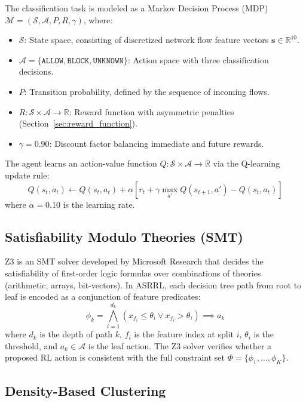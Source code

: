 \documentclass[12pt, letterpaper, oneside]{report}
\newcommand{\ASRRL}{\textsc{ASRRL}}
\newcommand{\R}{\mathbb{R}}
\newcommand{\bs}{\mathbf{s}}
\begin{document}
The classification task is modeled as a Markov Decision Process (MDP) $\mathcal{M} = (\mathcal{S}, \mathcal{A}, P, R, \gamma)$, where:
\begin{itemize}
    \item $\mathcal{S}$: State space, consisting of discretized network flow feature vectors $\bs \in \R^{10}$.
    \item $\mathcal{A} = \{\texttt{ALLOW}, \texttt{BLOCK}, \texttt{UNKNOWN}\}$: Action space with three classification decisions.
    \item $P$: Transition probability, defined by the sequence of incoming flows.
    \item $R: \mathcal{S} \times \mathcal{A} \rightarrow \R$: Reward function with asymmetric penalties (Section~\ref{sec:reward_function}).
    \item $\gamma = 0.90$: Discount factor balancing immediate and future rewards.
\end{itemize}

The agent learns an action-value function $Q: \mathcal{S} \times \mathcal{A} \rightarrow \R$ via the Q-learning update rule:
\begin{equation}
\label{eq:qlearning}
Q(s_t, a_t) \leftarrow Q(s_t, a_t) + \alpha \left[ r_t + \gamma \max_{a'} Q(s_{t+1}, a') - Q(s_t, a_t) \right]
\end{equation}
where $\alpha = 0.10$ is the learning rate.

\subsection{Satisfiability Modulo Theories (SMT)}

Z3 is an SMT solver developed by Microsoft Research that decides the satisfiability of first-order logic formulas over combinations of theories (arithmetic, arrays, bit-vectors). In \ASRRL{}, each decision tree path from root to leaf is encoded as a conjunction of feature predicates:
\begin{equation}
\label{eq:z3constraint}
\phi_k = \bigwedge_{i=1}^{d_k} \left( x_{f_i} \leq \theta_i \lor x_{f_i} > \theta_i \right) \implies a_k
\end{equation}
where $d_k$ is the depth of path $k$, $f_i$ is the feature index at split $i$, $\theta_i$ is the threshold, and $a_k \in \mathcal{A}$ is the leaf action. The Z3 solver verifies whether a proposed RL action is consistent with the full constraint set $\Phi = \{\phi_1, \ldots, \phi_K\}$.

\subsection{Density-Based Clustering}
\end{document}

